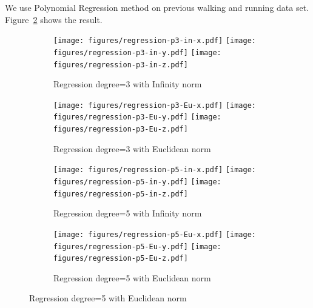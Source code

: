 We use Polynomial Regression method on previous walking and running data set.
Figure~\ref{fig:poly-regression} shows the result. 

\begin{figure}
\centering
\begin{subfigure}{\columnwidth}
\centering
\texttt{[image: figures/regression-p3-in-x.pdf]}
\texttt{[image: figures/regression-p3-in-y.pdf]}
\texttt{[image: figures/regression-p3-in-z.pdf]}
\caption{Regression degree=3 with Infinity norm}
\end{subfigure}
{\footnotesize}

\centering
\begin{subfigure}{\columnwidth}
\centering
\texttt{[image: figures/regression-p3-Eu-x.pdf]}
\texttt{[image: figures/regression-p3-Eu-y.pdf]}
\texttt{[image: figures/regression-p3-Eu-z.pdf]}
\caption{Regression degree=3 with Euclidean norm}
\end{subfigure}

\centering
\begin{subfigure}{\columnwidth}
\centering
\texttt{[image: figures/regression-p5-in-x.pdf]}
\texttt{[image: figures/regression-p5-in-y.pdf]}
\texttt{[image: figures/regression-p5-in-z.pdf]}
\caption{Regression degree=5 with Infinity norm}
\end{subfigure}
{\footnotesize}

\centering
\begin{subfigure}{\columnwidth}
\centering
\texttt{[image: figures/regression-p5-Eu-x.pdf]}
\texttt{[image: figures/regression-p5-Eu-y.pdf]}
\texttt{[image: figures/regression-p5-Eu-z.pdf]}
\caption{Regression degree=5 with Euclidean norm}
\label{fig:poly-regression}
\end{subfigure}

\end{figure}

